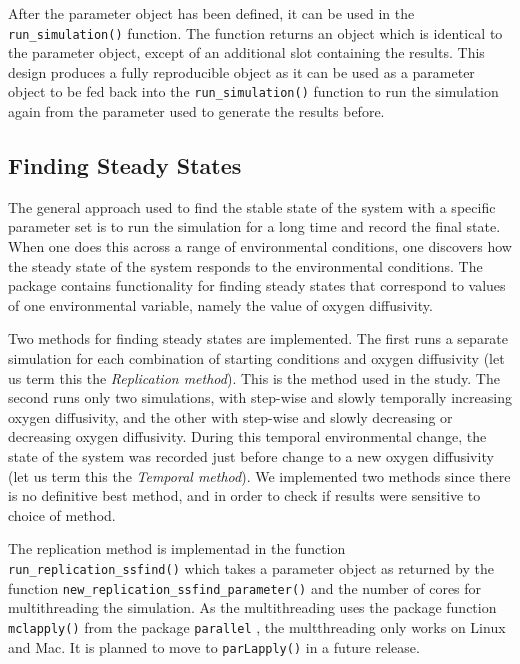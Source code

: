 \documentclass[]{elsarticle} %
\begin{document}
After the parameter object has been defined, it can be used in the
\texttt{run\_simulation()} function. The function returns an object
which is identical to the parameter object, except of an additional slot
containing the results. This design produces a fully reproducible object
as it can be used as a parameter object to be fed back into the
\texttt{run\_simulation()} function to run the simulation again from the
parameter used to generate the results before.

\hypertarget{finding-steady-states}{%
\subsection{Finding Steady States}\label{finding-steady-states}}

The general approach used to find the stable state of the system with a
specific parameter set is to run the simulation for a long time and
record the final state. When one does this across a range of
environmental conditions, one discovers how the steady state of the
system responds to the environmental conditions. The package contains
functionality for finding steady states that correspond to values of one
environmental variable, namely the value of oxygen diffusivity.

Two methods for finding steady states are implemented. The first runs a
separate simulation for each combination of starting conditions and
oxygen diffusivity (let us term this the \emph{Replication method}).
This is the method used in the \citet{Bush2017} study. The second runs
only two simulations, with step-wise and slowly temporally increasing
oxygen diffusivity, and the other with step-wise and slowly decreasing
or decreasing oxygen diffusivity. During this temporal environmental
change, the state of the system was recorded just before change to a new
oxygen diffusivity (let us term this the \emph{Temporal method}). We
implemented two methods since there is no definitive best method, and in
order to check if results were sensitive to choice of method.

The replication method is implementad in the function
\texttt{run\_replication\_ssfind()} which takes a parameter object as
returned by the function \texttt{new\_replication\_ssfind\_parameter()}
and the number of cores for multithreading the simulation. As the
multithreading uses the package function \texttt{mclapply()} from the
package \texttt{parallel} \citep{RCoreTeam2022}, the multthreading only
works on Linux and Mac. It is planned to move to \texttt{parLapply()}
\citep{RCoreTeam2022} in a future release.
\end{document}
